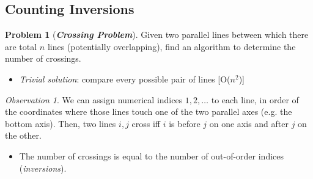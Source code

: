 \documentclass[12pt]{extarticle}
\theoremstyle{definition}
\newtheorem*{problem}{Problem}
\theoremstyle{remark}
\newtheorem*{observation}{Observation}
\newcommand{\probname}[1]{\noindent \textbf{\textit{#1}}}
\begin{document}
\pagebreak
\subsection{Counting Inversions}
\begin{problem}[\probname{Crossing Problem}]
    Given two parallel lines between which there are total $n$ lines (potentially overlapping), find an algorithm to determine the number of crossings.\begin{itemize}
        \item \textit{Trivial solution}: compare every possible pair of lines [O($n^2$)]
    \end{itemize}
\end{problem}

\begin{observation}
    We can assign numerical indices $1,2,\hdots$ to each line, in order of the coordinates where those lines touch one of the two parallel axes (e.g. the bottom axis). Then, two lines $i,j$ cross iff $i$ is before $j$ on one axis and after $j$ on the other. \begin{itemize}
        \item The number of crossings is equal to the number of out-of-order indices (\textit{inversions}).
    \end{itemize}
\end{observation}

\begin{center}
\end{center}
\end{document}
